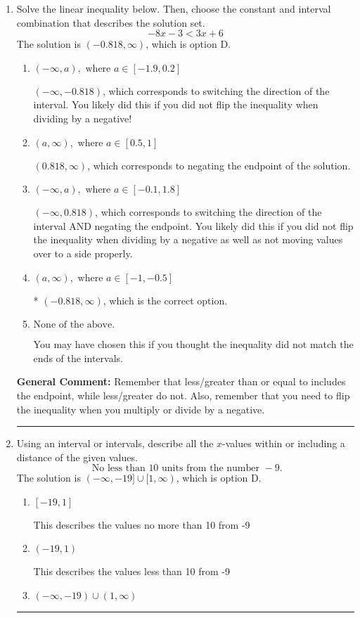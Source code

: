 \documentclass{extbook}[14pt]
\newcommand{\litem}[1]{\item #1

\rule{\textwidth}{0.4pt}}
\begin{document}
\begin{enumerate}\litem{
Solve the linear inequality below. Then, choose the constant and interval combination that describes the solution set.
\[ -8x -3 < 3x + 6 \]The solution is \( (-0.818, \infty) \), which is option D.\begin{enumerate}[label=\Alph*.]
\item \( (-\infty, a), \text{ where } a \in [-1.9, 0.2] \)

 $(-\infty, -0.818)$, which corresponds to switching the direction of the interval. You likely did this if you did not flip the inequality when dividing by a negative!
\item \( (a, \infty), \text{ where } a \in [0.5, 1] \)

 $(0.818, \infty)$, which corresponds to negating the endpoint of the solution.
\item \( (-\infty, a), \text{ where } a \in [-0.1, 1.8] \)

 $(-\infty, 0.818)$, which corresponds to switching the direction of the interval AND negating the endpoint. You likely did this if you did not flip the inequality when dividing by a negative as well as not moving values over to a side properly.
\item \( (a, \infty), \text{ where } a \in [-1, -0.5] \)

* $(-0.818, \infty)$, which is the correct option.
\item \( \text{None of the above}. \)

You may have chosen this if you thought the inequality did not match the ends of the intervals.
\end{enumerate}

\textbf{General Comment:} Remember that less/greater than or equal to includes the endpoint, while less/greater do not. Also, remember that you need to flip the inequality when you multiply or divide by a negative.
}
\litem{
Using an interval or intervals, describe all the $x$-values within or including a distance of the given values.
\[ \text{ No less than } 10 \text{ units from the number } -9. \]The solution is \( (-\infty, -19] \cup [1, \infty) \), which is option D.\begin{enumerate}[label=\Alph*.]
\item \( [-19, 1] \)

This describes the values no more than 10 from -9
\item \( (-19, 1) \)

This describes the values less than 10 from -9
\item \( (-\infty, -19) \cup (1, \infty) \)


\end{enumerate}}
\end{enumerate}
\end{document}
